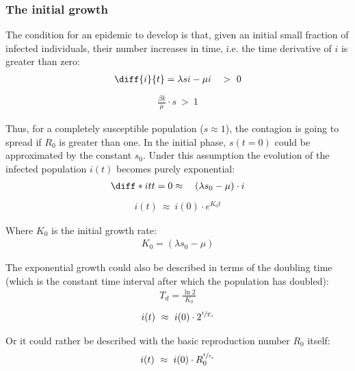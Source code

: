 \documentclass[DIV=12, BCOR=0pt]{scrartcl}  %
\begin{document}
  \subsubsection{The initial growth}
  The condition for an epidemic to develop is that, given an initial small fraction of infected individuals, their number increases in time, i.e. the time derivative of $i$ is greater than zero:
  \begin{align}
  	\diff{i}{t} = \lambda s i - \mu i \quad > \ 0 
  	\label{sir_growthCond}
  \end{align}
  \begin{align} %
  	\frac{\beta \bar{k} }{\mu} \cdot s \ > \ 1  %
  	\label{eq:sir_growthReq}
  \end{align}
  
  Thus, for a completely susceptible population ($s \approx 1$), the contagion is going to spread if $R_0$ is greater than one. In the initial phase, $s( t \! = \! 0)$ could be approximated by the constant $s_0$.
  Under this assumption the evolution of the infected population $i(t)$ becomes purely exponential:
  \begin{align}
  	\diff*{i}{t}{t=0} \approx \quad (\lambda s_0 - \mu) \cdot i 
  	\label{eq:sir_approxi}
  \end{align}
  \begin{align} %
  	i(t) \ \approx \ i(0) \cdot e^{K_0 t} 
  	\label{eq:sir_growthK0}
  \end{align}
  
 Where $K_0$ is the initial growth rate:
 \begin{align} %
 	K_0 = (\lambda s_0 - \mu)
 	\label{eq:sir_K0}
 \end{align}
 
 The exponential growth could also be described in terms of the doubling time (which is the constant time interval after which the population has doubled):
	\begin{align}
		T_{d} = \frac{\ln 2}{K_0} %
		\label{eq:doubling} 
	\end{align}
	\begin{align}
		i(t) \ \approx \ i(0) \cdot 2^{\sfrac{t}{T_{d}}}
		\label{eq:sir_growthTd} 
	\end{align}

	Or it could rather be described with the basic reproduction number $R_0$ itself:
	\begin{align}
		i(t) \ \approx \ i(0) \cdot R_0^{\sfrac{t}{\tau_s}}
		\label{eq:sir_growthR0}
	\end{align}
\end{document}
